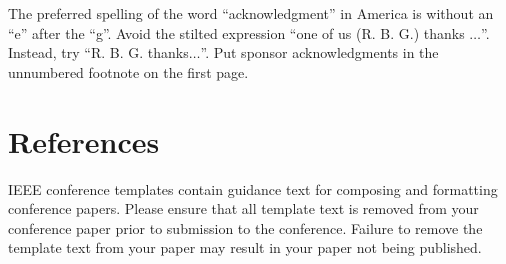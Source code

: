 \documentclass[conference]{IEEEtran}
\begin{document}
The preferred spelling of the word ``acknowledgment'' in America is without 
an ``e'' after the ``g''. Avoid the stilted expression ``one of us (R. B. 
G.) thanks $\ldots$''. Instead, try ``R. B. G. thanks$\ldots$''. Put sponsor 
acknowledgments in the unnumbered footnote on the first page.

\section{References}




\vspace{12pt}
\color{red}
IEEE conference templates contain guidance text for composing and formatting conference papers. Please ensure that all template text is removed from your conference paper prior to submission to the conference. Failure to remove the template text from your paper may result in your paper not being published.
\end{document}
